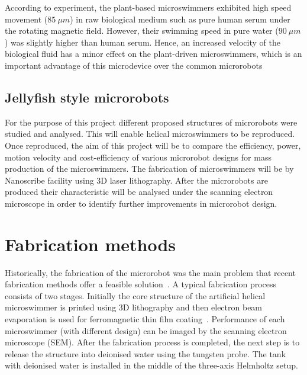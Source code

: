 \documentclass[12pt,a4paper,titlepage]{report}
\newcommand{\hilight}[1]{\colorbox{yellow}{#1}}
\begin{document}
According to \citeauthor{gao2013bioinspired} experiment, the plant-based 
microswimmers exhibited high speed movement ($85~\mu m$) in raw biological medium such as 
pure human serum under the rotating magnetic field. However, their swimming speed in pure water
 ($90~\mu m$) was slightly higher than human serum.   
 Hence, an increased velocity of the 
biological fluid has a minor effect on the plant-driven microswimmers, which is an important 
advantage of this microdevice over the common microrobots%




\subsection{Jellyfish style microrobots}
For the purpose of this project different proposed structures of microrobots were studied
 and analysed. This will enable helical microswimmers to be reproduced. Once reproduced, the aim of this project will be to compare
 the efficiency, power, motion velocity and cost-efficiency of various microrobot designs for mass production
 of the microswimmers. The fabrication of microswimmers will be by Nanoscribe facility using 3D laser
 lithography. After the microrobots are produced their characteristic will be analysed
 under the scanning electron microscope in order to identify further improvements in microrobot design. 



\section{Fabrication methods}







Historically, the fabrication of the microrobot was the main problem that recent fabrication methods 
offer a feasible solution~\citep{gao2013bioinspired}. 
A typical fabrication process consists of two stages. Initially the core structure of the artificial helical 
microswimmer is printed using 3D lithography and then electron beam evaporation is used for 
ferromagnetic thin film coating~\citep{tottori2013artificial}.  
Performance of each microswimmer (with different design) can be imaged by the scanning electron
 microscope (SEM). After the fabrication process is completed, the next step is to release the structure into 
deionised water using the tungsten probe. The tank with deionised water is installed in the middle of the 
three-axis Helmholtz setup. 
\end{document}
